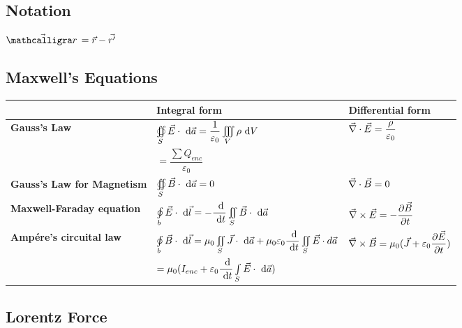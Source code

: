 		\subsection{Notation}
        \begin{itemize}
        \itemt \( \vec{\scriptr} = \vec{r} - \vec{r'} \)
        \end{itemize}

		\subsection{Maxwell's Equations}

\def\arraystretch{3}
\begin{tabular}{ |l|l|l| } 
\hline
					
  &	\textbf{Integral form}	& 	\textbf{Differential form}
\\ \hline

\textbf{Gauss's Law}	
&\( \oiint\limits_{S} \vec{E} \cdot \ \mathrm{d}\vec{a} = \dfrac{1}{\varepsilon_0} \iiint\limits_V \rho \ \mathrm{d}V \)	
& \( \vec{\nabla}\cdot \vec{E} = \dfrac{\rho}{\varepsilon_0} \)
\\
& \hspace{1.4cm}\( = \dfrac{\sum Q_{enc}}{\varepsilon_0} \) &
\\ \hline

\textbf{Gauss's Law for Magnetism}	
&\( \oiint\limits_{S} \vec{B} \cdot \ \mathrm{d}\vec{a} = 0 \)
&\( \vec{\nabla}\cdot \vec{B} = 0 \)
\\ \hline

\textbf{Maxwell-Faraday equation}	
&\( \oint\limits_{b} \vec{E} \cdot \dn\vec{l} = -\dd{}{t} \iint\limits_S \vec{B} \cdot \dn\vec{a}\)	&\( \vec{\nabla}\times \vec{E} = -\dfrac{\partial \vec{B}}{\partial t} \)
\\ \hline

\textbf{Amp\'ere's circuital law}	
& \( \oint\limits_{b} \vec{B} \cdot \dn\vec{l} = \mu_0 \iint\limits_S \vec{J} \cdot \dn\vec{a} + \mu_0\varepsilon_0 \dd{}{t} \iint\limits_S \vec{E}\cdot d\vec{a}\)	
&\( \vec{\nabla}\times \vec{B} = \mu_0(\vec{J} + \varepsilon_0 \dfrac{\partial \vec{E}}{\partial t}) \)
\\
& \hspace{1.1cm} \( = \mu_0 (I_{enc} + \varepsilon_0 \dd{}{t} \int\limits_S \vec{E} \cdot \dn\vec{a} ) \) &
\\ \hline
\end{tabular}


		\subsection{Lorentz Force}

